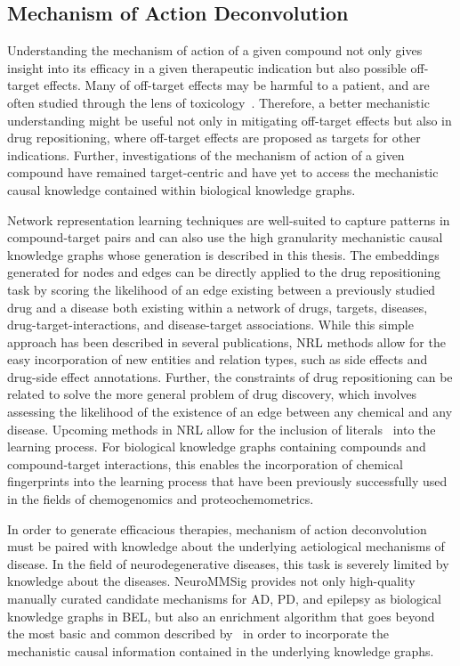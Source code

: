 \subsection{Mechanism of Action Deconvolution}

Understanding the mechanism of action of a given compound not only gives insight into its efficacy in a given therapeutic indication but also possible off-target effects.
Many of off-target effects may be harmful to a patient, and are often studied through the lens of toxicology~\cite{Lee2013}.
Therefore, a better mechanistic understanding might be useful not only in mitigating off-target effects but also in drug repositioning, where off-target effects are proposed as targets for other indications.
Further, investigations of the mechanism of action of a given compound have remained target-centric and have yet to access the mechanistic causal knowledge contained within biological knowledge graphs.

Network representation learning techniques are well-suited to capture patterns in compound-target pairs and can also use the high granularity mechanistic causal knowledge graphs whose generation is described in this thesis.
The embeddings generated for nodes and edges can be directly applied to the drug repositioning task by scoring the likelihood of an edge existing between a previously studied drug and a disease both existing within a network of drugs, targets, diseases, drug-target-interactions, and disease-target associations.
While this simple approach has been described in several publications, \ac{NRL} methods allow for the easy incorporation of new entities and relation types, such as side effects and drug-side effect annotations.
Further, the constraints of drug repositioning can be related to solve the more general problem of drug discovery, which involves assessing the likelihood of the existence of an edge between any chemical and any disease.
Upcoming methods in \ac{NRL} allow for the inclusion of literals~\cite{Kristiadi2018} into the learning process.
For biological knowledge graphs containing compounds and compound-target interactions, this enables the incorporation of chemical fingerprints into the learning process that have been previously successfully used in the fields of chemogenomics and proteochemometrics.

In order to generate efficacious therapies, mechanism of action deconvolution must be paired with knowledge about the underlying aetiological mechanisms of disease.
In the field of neurodegenerative diseases, this task is severely limited by knowledge about the diseases.
NeuroMMSig provides not only high-quality manually curated candidate mechanisms for \ac{AD}, \ac{PD}, and epilepsy as biological knowledge graphs in \ac{BEL}, but also an enrichment algorithm that goes beyond the most basic and common described by~\cite{Khatri2012} in order to incorporate the mechanistic causal information contained in the underlying knowledge graphs.

